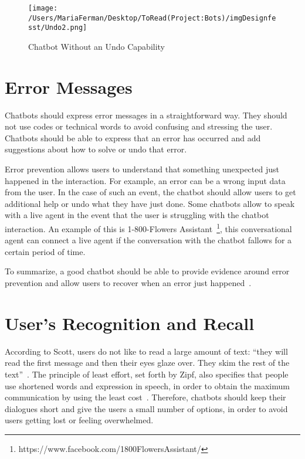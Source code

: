 \documentclass[a4paper,10pt]{article}
\begin{document}
\begin{figure}
\centering
\texttt{[image: /Users/MariaFerman/Desktop/ToRead(Project:Bots)/imgDesignfesst/Undo2.png]}
\caption{Chatbot Without an Undo Capability}
\label{FigureUndo}
\end{figure}

\section{Error Messages}

Chatbots should express error messages in a straightforward way. They should not use codes or technical words to avoid confusing and stressing the user. Chatbots should be able to express that an error has occurred and add suggestions about how to solve or undo that error. 

Error prevention allows users to understand that something unexpected just happened in the interaction. For example, an error can be a wrong input data from the user. In the case of such an event, the chatbot should allow users to get additional help or undo what they have just done. Some chatbots  allow to speak with a live agent in the event that the user is struggling with the chatbot interaction. An example of this is 1-800-Flowers Assistant~\footnote{https://www.facebook.com/1800FlowersAssistant/}, this conversational agent can connect a live agent if the conversation with the chatbot fallows for a certain period of time. 

To summarize, a good chatbot should be able to provide evidence around error prevention and allow users to recover when an error just happened~\cite{HeuristicsWebPage}. 

\section{User's Recognition and Recall}

According to Scott, users do not like to read a large amount of text: ``they will read the first message and then their eyes glaze over. They skim the rest of the text”~\cite{HeuristicsWebPage}. The principle of least effort, set forth by Zipf, also specifies that people use shortened words and expression in speech, in order to obtain the maximum communication by using the least cost~\cite{zipf2016human}. Therefore, chatbots should keep their dialogues short and give the users a small number of options, in order to avoid users getting lost or feeling overwhelmed.
\end{document}
